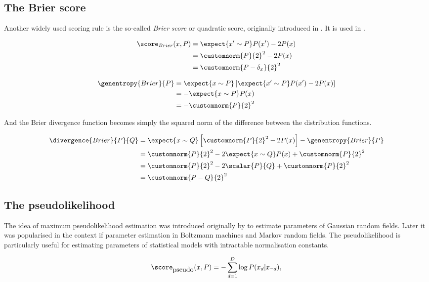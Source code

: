 \subsection{The Brier score}

Another widely used scoring rule is the so-called \emph{Brier score} or quadratic score, originally introduced in \cite{Brier1950}. It is used in .

\begin{align}
	\score_{Brier}(x,P) &= \expect{x' \sim P} P(x') - 2P(x)\\
		&= \customnorm{P}{2}^{2} - 2P(x) \\
		&= \customnorm{P - \delta_{x}}{2}^2
\end{align}

\begin{align}
	\genentropy{Brier}{P} &= \expect{x \sim P}\left[\expect{x' \sim P} P(x') - 2P(x)\right]\\
		&= -\expect{x \sim P} P(x)\\
		&= -\customnorm{P}{2}^2
\end{align}

And the Brier divergence function becomes simply the squared norm of the difference between the distribution functions.

\begin{align}
	\divergence{Brier}{P}{Q} &= \expect{x \sim Q}\left[\customnorm{P}{2}^2 - 2P(x)\right] - \genentropy{Brier}{P} \\
		&= \customnorm{P}{2}^2 -2 \expect{x \sim Q} P(x) + \customnorm{P}{2}^2 \\
		&= \customnorm{P}{2}^2 - 2\scalar{P}{Q} + \customnorm{P}{2}^2\\
		&= \customnorm{P-Q}{2}^2
\end{align}

\subsection{The pseudolikelihood}

The idea of maximum pseudolikelihood estimation was introduced originally by \cite{Besag1977} to estimate parameters of Gaussian random fields. Later it was popularised in the context if parameter estimation in Boltzmann machines \cite{Hyvarinnen} and Markov random fields. The pseudolikelihood is particularly useful for estimating parameters of statistical models with intractable normalisation constants.

\begin{equation}
	\score_{\mbox{pseudo}}(x,P) = - \sum_{d=1}^{D} \log P(x_d\vert x_{\neg d}),
\end{equation}

